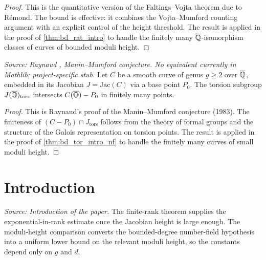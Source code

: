 \begin{proof}
  This is the quantitative version of the Faltings--Vojta theorem due to Rémond.
  The bound is effective: it combines the Vojta--Mumford counting argument with an
  explicit control of the height threshold. The result is applied in the proof of
  \cref{thm:bd_rat_intro} to handle the finitely many \(\overline{\mathbb{Q}}\)-isomorphism classes
  of curves of bounded moduli height.
\end{proof}

\begin{theorem}
  \label{thm:raynaud_mm}
  \textit{Source: Raynaud \cite{Raynaud}, Manin--Mumford conjecture. No equivalent currently in Mathlib; project-specific stub.}
  Let \(C\) be a smooth curve of genus \(g \ge 2\) over \(\overline{\mathbb{Q}}\), embedded in its
  Jacobian \(J = \mathrm{Jac}(C)\) via a base point \(P_0\). The torsion subgroup
  \(J(\overline{\mathbb{Q}})_{\mathrm{tors}}\) intersects \(C(\overline{\mathbb{Q}}) - P_0\) in finitely many points.
\end{theorem}

\begin{proof}
  This is Raynaud's proof of the Manin--Mumford conjecture (1983). The finiteness
  of \((C - P_0) \cap J_{\mathrm{tors}}\) follows from the theory of formal groups
  and the structure of the Galois representation on torsion points. The result is
  applied in the proof of \cref{thm:bd_tor_intro_nf} to handle the finitely many
  curves of small moduli height.
\end{proof}

\section{Introduction}

\begin{theorem}
  \label{thm:bd_rat_intro}
  \textit{Source: Introduction of the paper.}
  The finite-rank theorem supplies the exponential-in-rank estimate once the
  Jacobian height is large enough. The moduli-height comparison converts the
  bounded-degree number-field hypothesis into a uniform lower bound on the
  relevant moduli height, so the constants depend only on \(g\) and \(d\).
\end{theorem}


